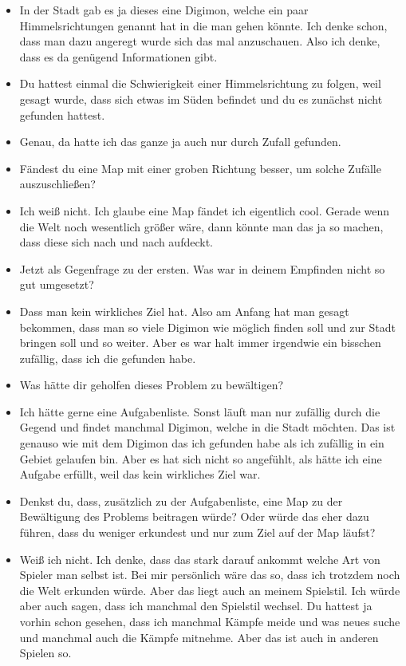 {\begin{itemize}[]
    \item {} In der Stadt gab es ja dieses eine Digimon, welche ein paar Himmelsrichtungen genannt hat in die man gehen könnte. Ich denke schon, dass man dazu angeregt wurde sich das mal anzuschauen. Also ich denke, dass es da genügend Informationen gibt. 
    \item {} Du hattest einmal die Schwierigkeit einer Himmelsrichtung zu folgen, weil gesagt wurde, dass sich etwas im Süden befindet und du es zunächst nicht gefunden hattest.
    \item {} Genau, da hatte ich das ganze ja auch nur durch Zufall gefunden.
    \item {} Fändest du eine Map mit einer groben Richtung besser, um solche Zufälle auszuschließen?
    \item {} Ich weiß nicht. Ich glaube eine Map fändet ich eigentlich cool. Gerade wenn die Welt noch wesentlich größer wäre, dann könnte man das ja so machen, dass diese sich nach und nach aufdeckt.
    \item {} Jetzt als Gegenfrage zu der ersten. Was war in deinem Empfinden nicht so gut umgesetzt?
    \item {} Dass man kein wirkliches Ziel hat. Also am Anfang hat man gesagt bekommen, dass man so viele Digimon wie möglich finden soll und zur Stadt bringen soll und so weiter. Aber es war halt immer irgendwie ein bisschen zufällig, dass ich die gefunden habe.
    \item {} Was hätte dir geholfen dieses Problem zu bewältigen?
    \item {} Ich hätte gerne eine Aufgabenliste. Sonst läuft man nur zufällig durch die Gegend und findet manchmal Digimon, welche in die Stadt möchten. Das ist genauso wie mit dem Digimon das ich gefunden habe als ich zufällig in ein Gebiet gelaufen bin. Aber es hat sich nicht so angefühlt, als hätte ich eine Aufgabe erfüllt, weil das kein wirkliches Ziel war.
    \item {} Denkst du, dass, zusätzlich zu der Aufgabenliste, eine Map zu der Bewältigung des Problems beitragen würde? Oder würde das eher dazu führen, dass du weniger erkundest und nur zum Ziel auf der Map läufst?
    \item {} Weiß ich nicht. Ich denke, dass das stark darauf ankommt welche Art von Spieler man selbst ist. Bei mir persönlich wäre das so, dass ich trotzdem noch die Welt erkunden würde. Aber das liegt auch an meinem Spielstil. Ich würde aber auch sagen, dass ich manchmal den Spielstil wechsel. Du hattest ja vorhin schon gesehen, dass ich manchmal Kämpfe meide und was neues suche und manchmal auch die Kämpfe mitnehme. Aber das ist auch in anderen Spielen so.

\end{itemize}}
